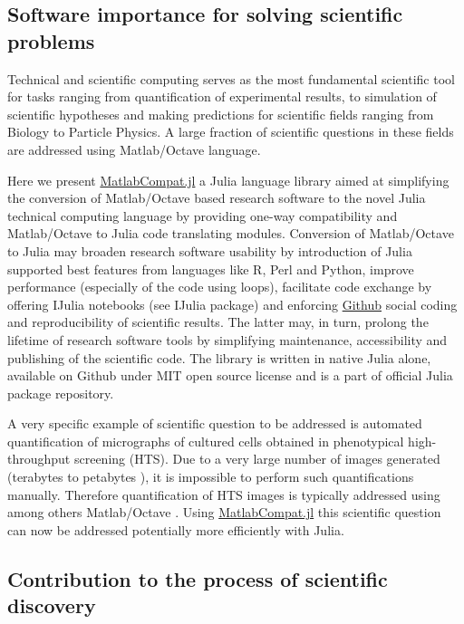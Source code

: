 \subsection{Software importance for solving scientific problems}

Technical and scientific computing serves as the most fundamental scientific tool for tasks ranging from quantification of experimental results, to simulation of scientific hypotheses and making predictions for scientific fields ranging from Biology to Particle Physics. A large fraction of scientific questions in these fields are addressed using Matlab/Octave language.

Here we present \href{https://github.com/MatlabCompat/MatlabCompat.jl}{MatlabCompat.jl} a Julia language library aimed at simplifying the conversion of Matlab/Octave based research software to the novel Julia technical computing language by providing one-way compatibility and Matlab/Octave to Julia code translating modules. Conversion of Matlab/Octave to Julia may broaden research software usability by introduction of Julia supported best features from languages like R, Perl and Python, improve performance (especially of the code using loops), facilitate code exchange by offering IJulia notebooks (see IJulia package) and enforcing \href{http://github.com}{Github} social coding  and reproducibility of scientific results. The latter may, in turn, prolong the lifetime of research software tools by simplifying maintenance, accessibility and publishing of the scientific code. The library is written in native Julia alone, available on Github under MIT open source license and is a part of official Julia package repository.

A very specific example of scientific question to be addressed is automated quantification of micrographs of cultured cells obtained in phenotypical high-throughput screening (HTS). Due to a very large number of images generated (terabytes to petabytes \cite{R_m__2014}), it is impossible to perform such quantifications manually. Therefore quantification of HTS images is typically addressed using among others Matlab/Octave \cite{22787215, 17076895, R_m__2014}. Using \href{https://github.com/MatlabCompat/MatlabCompat.jl}{MatlabCompat.jl} this scientific question can now be addressed potentially more efficiently with Julia.

\subsection{Contribution to the process of scientific discovery}

